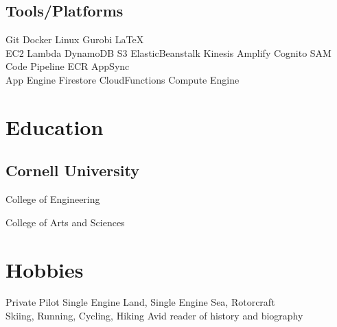 \documentclass[]{plushcv}
\begin{document}
\begin{minipage}[t]{0.25\textwidth}
    \sectionsep
    \sectionsep
    \subsection{Tools/Platforms}
    \sectionsep
    Git  \textbullet{} Docker \textbullet{} Linux \textbullet{} Gurobi \textbullet{} \LaTeX \\
    \sectionsep
    EC2 \textbullet{} Lambda \textbullet{} DynamoDB \textbullet{} S3 \textbullet{} ElasticBeanstalk
    \textbullet{} Kinesis \textbullet{} Amplify \textbullet{} Cognito \textbullet{} SAM 
    \textbullet{} Code Pipeline \textbullet{} ECR \textbullet{} AppSync\\
    \sectionsep
    App Engine \textbullet{} Firestore \textbullet{} CloudFunctions \textbullet{} Compute Engine
    
    \sectionsep
    
    
    \section{Education} 
    \subsection{Cornell University}
    College of Engineering \\
    
    \sectionsep
    College of Arts and Sciences \\
    \sectionsep

    \section{Hobbies}
    Private Pilot Single Engine Land, Single Engine Sea, Rotorcraft\\
    Skiing, Running, Cycling, Hiking
    Avid reader of history and biography

    
    

\end{minipage}
\end{document}
